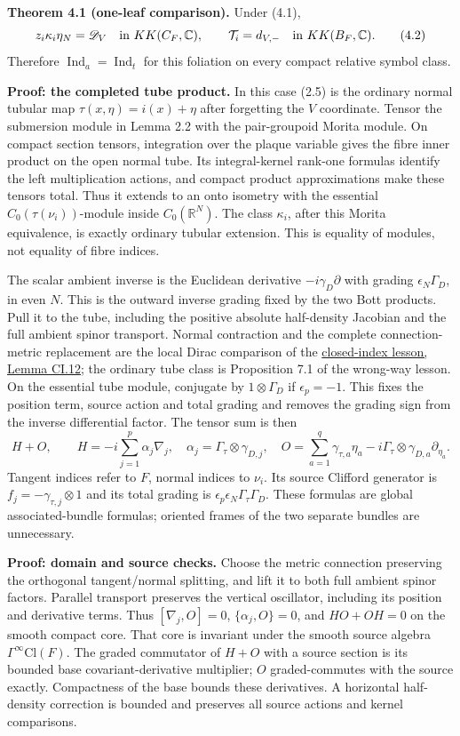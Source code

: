 \documentclass[
  11pt,
]{article}
\begin{document}
\textbf{Theorem 4.1 (one-leaf comparison).} Under (4.1), \[
 z_i\kappa_i\eta_N=\mathscr D_V\quad\hbox{in }KK(C_F,\mathbb C),
 \qquad \mathcal T_i=d_{V,-}\quad\hbox{in }KK(B_F,\mathbb C).
 \tag{4.2}
\] Therefore \(\operatorname{Ind}_a=\operatorname{Ind}_t\) for this
foliation on every compact relative symbol class.

\textbf{Proof: the completed tube product.} In this case (2.5) is the
ordinary normal tubular map \(\tau(x,\eta)=i(x)+\eta\) after forgetting
the \(V\) coordinate. Tensor the submersion module in Lemma 2.2 with the
pair-groupoid Morita module. On compact section tensors, integration
over the plaque variable gives the fibre inner product on the open
normal tube. Its integral-kernel rank-one formulas identify the left
multiplication actions, and compact product approximations make these
tensors total. Thus it extends to an onto isometry with the essential
\(C_0(\tau(\nu_i))\)-module inside \(C_0(\mathbb R^N)\). The class
\(\kappa_i\), after this Morita equivalence, is exactly ordinary tubular
extension. This is equality of modules, not equality of fibre indices.

The scalar ambient inverse is the Euclidean derivative
\(-i\gamma_D\partial\) with grading \(\epsilon_N\Gamma_D\), in even
\(N\). This is the outward inverse grading fixed by the two Bott
products. Pull it to the tube, including the positive absolute
half-density Jacobian and the full ambient spinor transport. Normal
contraction and the complete connection-metric replacement are the local
Dirac comparison of the
\href{KT-KK-15.html\#10-tubular-extension-and-the-embedding-index}{closed-index
lesson, Lemma CI.12}; the ordinary tube class is Proposition 7.1 of the
wrong-way lesson. On the essential tube module, conjugate by
\(1\otimes\Gamma_D\) if \(\epsilon_p=-1\). This fixes the position term,
source action and total grading and removes the grading sign from the
inverse differential factor. The tensor sum is then \[
 H+O,\qquad
 H=-i\sum_{j=1}^p\alpha_j\nabla_j,
 \quad\alpha_j=\Gamma_\tau\otimes\gamma_{D,j},
 \quad O=\sum_{a=1}^q\gamma_{\tau,a}\eta_a
             -i\Gamma_\tau\otimes\gamma_{D,a}\partial_{\eta_a}.
 \tag{4.3}
\] Tangent indices refer to \(F\), normal indices to \(\nu_i\). Its
source Clifford generator is \(f_j=-\gamma_{\tau,j}\otimes1\) and its
total grading is \(\epsilon_p\epsilon_N\Gamma_\tau\Gamma_D\). These
formulas are global associated-bundle formulas; oriented frames of the
two separate bundles are unnecessary.

\textbf{Proof: domain and source checks.} Choose the metric connection
preserving the orthogonal tangent/normal splitting, and lift it to both
full ambient spinor factors. Parallel transport preserves the vertical
oscillator, including its position and derivative terms. Thus
\([\nabla_j,O]=0\), \(\{\alpha_j,O\}=0\), and \(HO+OH=0\) on the smooth
compact core. That core is invariant under the smooth source algebra
\(\Gamma^\infty\mathrm{Cl}(F)\). The graded commutator of \(H+O\) with a
source section is its bounded base covariant-derivative multiplier;
\(O\) graded-commutes with the source exactly. Compactness of the base
bounds these derivatives. A horizontal half-density correction is
bounded and preserves all source actions and kernel comparisons.
\end{document}

